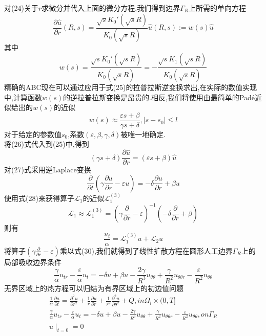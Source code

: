 \documentclass[a4paper,15pt,twoside,zihao=-4]{article}
\begin{document}
\indent 对(24)关于$r$求微分并代入上面的微分方程,我们得到边界$\Gamma_R $上所需的单向方程
\begin{equation}
\frac{\partial \hat{u} }{\partial r}(R,s)=\frac{\sqrt{s}K_0'(\sqrt{s}R)}{K_0(\sqrt{s}R)}\hat{u}(R,s)
:=w(s) \hat{u} 
\end{equation}
其中$$w(s)=\frac{\sqrt{s}K_0'(\sqrt{s}R)}{K_0(\sqrt{s}R)}=-\frac{\sqrt{s}K_1(\sqrt{s}R)}{K_0(\sqrt{s}R)}$$
\indent 精确的ABC现在可以通过应用于式(25)的拉普拉斯逆变换求出,在实际的数值实现中,计算函数$w(s)$的逆拉普拉斯变换是昂贵的.相反,我们将使用由最简单的Padé近似给出的$w(s)$的近似
\begin{equation}
w(s)\approx \frac{\varepsilon  s+\beta}{\gamma s+\delta },\left | s-s_0 \right |\le l
\end{equation}
对于给定的参数值$s_0$,系数$(\varepsilon ,\beta,\gamma,\delta)$被唯一地确定.\\
\indent 将(26)式代入到(25)中,得到
\begin{equation}
(\gamma s+\delta)\frac{\partial \hat{u} }{\partial r}=(\varepsilon  s+\beta)\hat{u}    
\end{equation}
\indent 对(27)式采用逆Laplace变换
\begin{equation}
\frac{\partial }{\partial t}\left (\gamma\frac{\partial u}{\partial r}-\varepsilon  u \right )
=-\delta\frac{\partial u}{\partial r}  +\beta u 
\end{equation}
\indent 使用式(28)来获得算子$\mathcal{L}_1$的近似$\mathcal{L}^{(3)}_1$
\begin{equation}
\mathcal{L}_1\approx\mathcal{L}^{(3)}_1 =\left (\gamma\frac{\partial}{\partial r}-\varepsilon \right )^{-1}
\left (  -\delta\frac{\partial}{\partial r}  +\beta\right ) 
\end{equation}
\indent 则有
\begin{equation}
\frac{u_t}{\alpha}=\mathcal{L}^{(3)}_1u+\mathcal{L}_2u
\end{equation}
\indent 将算子$\left (\gamma\frac{\partial}{\partial r}-\varepsilon \right )$乘以式(30),我们就得到了线性扩散方程在圆形人工边界$\Gamma_R$上的局部吸收边界条件
\begin{equation}
\frac{\gamma}{\alpha}u_{tr}-\frac{\varepsilon }{\alpha}u_t=-\delta u+\beta u-\frac{2\gamma}{R^3}u_{\theta\theta}
+\frac{\gamma}{R^2}u_{\theta\theta r}-\frac{\varepsilon }{R^2}u_{\theta\theta}
\end{equation}
\indent 无界区域上的热方程可以归结为有界区域上的初边值问题
\begin{equation}
\begin{array}{l}
\displaystyle\frac{1}{\alpha} \frac{\partial u}{\partial t}=\frac{\partial^2u}{\partial r^2}+
\frac{1}{r}\frac{\partial u}{\partial r}+\frac{1}{r^2}\frac{\partial^2u}{\partial \theta^2}+Q, in \Omega_{i} \times(0, T] \\
\displaystyle\frac{\gamma}{\alpha}u_{tr}-\frac{\varepsilon }{\alpha}u_t=-\delta u+\beta u-\frac{2\gamma}{R^3}u_{\theta\theta}
+\frac{\gamma}{R^2}u_{\theta\theta r}-\frac{\varepsilon }{R^2}u_{\theta\theta},on \Gamma_R \\
u\mid _{t=0}=0
\end{array}
\end{equation}
\end{document}
